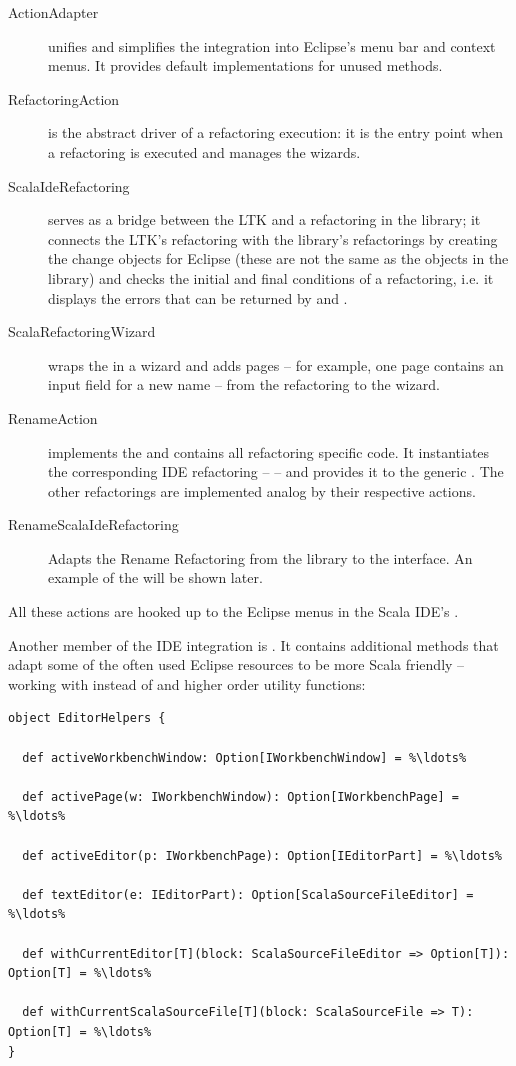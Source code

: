 \documentclass[10pt,a4paper,oneside]{scrreprt}
\begin{document}
\begin{description}
  \item[ActionAdapter] unifies and simplifies the integration into Eclipse's menu bar and context menus. It provides default implementations for unused methods.
  
  \item[RefactoringAction] is the abstract driver of a refactoring execution: it is the entry point when a refactoring is executed and manages the wizards.

  \item[ScalaIdeRefactoring] serves as a bridge between the LTK and a refactoring in the library; it connects the LTK's refactoring with the library's refactorings by creating the change objects for Eclipse (these are not the same as the  objects in the library) and checks the initial and final conditions of a refactoring, i.e. it displays the errors that can be returned by  and .
  
  \item[ScalaRefactoringWizard] wraps the  in a wizard and adds pages -- for example, one page contains an input field for a new name -- from the refactoring to the wizard.
    
  \item[RenameAction] implements the  and contains all refactoring specific code. It instantiates the corresponding IDE refactoring --  -- and provides it to the generic . The other refactorings are implemented analog by their respective actions.
  
  \item[RenameScalaIdeRefactoring] Adapts the Rename Refactoring from the library to the  interface. An example of the  will be shown later.
\end{description}

All these actions are hooked up to the Eclipse menus in the Scala IDE's .

Another member of the IDE integration is . It contains additional methods that adapt some of the often used Eclipse resources to be more Scala friendly -- working with  instead of  and higher order utility functions:

\begin{lstlisting}
object EditorHelpers {

  def activeWorkbenchWindow: Option[IWorkbenchWindow] = %\ldots%

  def activePage(w: IWorkbenchWindow): Option[IWorkbenchPage] = %\ldots%

  def activeEditor(p: IWorkbenchPage): Option[IEditorPart] = %\ldots%

  def textEditor(e: IEditorPart): Option[ScalaSourceFileEditor] = %\ldots%

  def withCurrentEditor[T](block: ScalaSourceFileEditor => Option[T]): Option[T] = %\ldots%

  def withCurrentScalaSourceFile[T](block: ScalaSourceFile => T): Option[T] = %\ldots%
}
\end{lstlisting}
\end{document}
